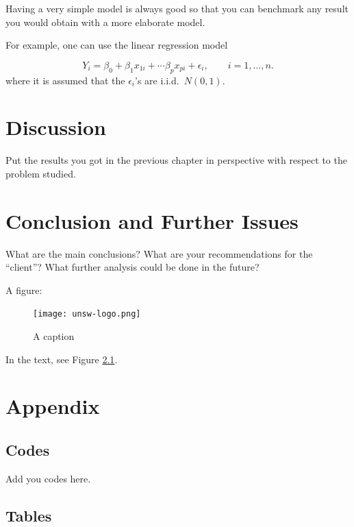 \documentclass[mstat,12pt]{unswthesis}
\begin{document}
Having a very simple model is always good so that you can benchmark any
result you would obtain with a more elaborate model.

\bigskip

For example, one can use the linear regression model

\[
Y_i = \beta_0 + \beta_1 x_{1i} + \cdots \beta_p x_{pi} + \epsilon_i, \qquad i=1,\ldots,n.
\] where it is assumed that the \(\epsilon_i\)'s are i.i.d.~\(N(0,1)\).

\chapter{Discussion}\label{discussion}

Put the results you got in the previous chapter in perspective with
respect to the problem studied.

\chapter{Conclusion and Further
Issues}\label{conclusion-and-further-issues}

What are the main conclusions? What are your recommendations for the
``client''? What further analysis could be done in the future?

A figure:

\begin{figure}[H]
\texttt{[image: unsw-logo.png]}
\caption{A caption}\label{myfigure}
\end{figure}

In the text, see Figure \ref{myfigure}.




\chapter*{Appendix}\label{appendix}

\section*{\texorpdfstring{\textbf{Codes}}{Codes}}\label{codes}

Add you codes here.

\section*{\texorpdfstring{\textbf{Tables}}{Tables}}\label{tables}
\end{document}
